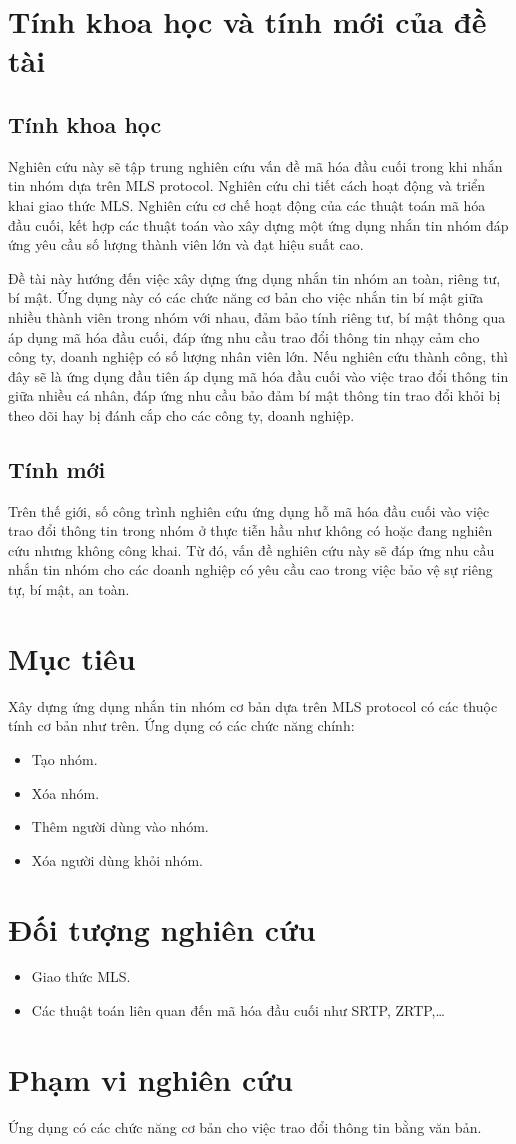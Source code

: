 \documentclass[../main-report.tex]{subfiles}
\begin{document}
\section{Tính khoa học và tính mới của đề tài}
\subsection{Tính khoa học}

Nghiên cứu này sẽ tập trung nghiên cứu vấn đề mã hóa đầu cuối trong khi nhắn tin nhóm dựa trên MLS protocol. Nghiên cứu chi tiết cách hoạt động và triển khai giao thức MLS. Nghiên cứu cơ chế hoạt động của các thuật toán mã hóa đầu cuối, kết hợp các thuật toán vào xây dựng một ứng dụng nhắn tin nhóm đáp ứng yêu cầu số lượng thành viên lớn và đạt hiệu suất cao.

Đề tài này hướng đến việc xây dựng ứng dụng nhắn tin nhóm an toàn, riêng tư, bí mật. Ứng dụng này có các chức năng cơ bản cho việc nhắn tin bí mật giữa nhiều thành viên trong nhóm với nhau, đảm bảo tính riêng tư, bí mật thông qua áp dụng mã hóa đầu cuối, đáp ứng nhu cầu trao đổi thông tin nhạy cảm cho công ty, doanh nghiệp có số lượng nhân viên lớn. Nếu nghiên cứu thành công, thì đây sẽ là ứng dụng đầu tiên áp dụng mã hóa đầu cuối vào việc trao đổi thông tin giữa nhiều cá nhân, đáp ứng nhu cầu bảo đảm bí mật thông tin trao đổi khỏi bị theo dõi hay bị đánh cắp cho các công ty, doanh nghiệp.


\subsection{Tính mới}

Trên thế giới, số công trình nghiên cứu ứng dụng hỗ mã hóa đầu cuối vào việc trao đổi thông tin trong nhóm ở thực tiễn hầu như không có hoặc đang nghiên cứu nhưng không công khai. Từ đó, vấn đề nghiên cứu này sẽ đáp ứng nhu cầu nhắn tin nhóm cho các doanh nghiệp có yêu cầu cao trong việc bảo vệ sự riêng tự, bí mật, an toàn. 

\section{Mục tiêu}

Xây dựng ứng dụng nhắn tin nhóm cơ bản dựa trên MLS protocol có các thuộc tính cơ bản như trên. 
Ứng dụng có các chức năng chính:

\begin{itemize}
\item Tạo nhóm.
\item Xóa nhóm.
\item Thêm người dùng vào nhóm.
\item Xóa người dùng khỏi nhóm.
\end{itemize}

\section{Đối tượng nghiên cứu}
\begin{itemize}
\item Giao thức MLS.
\item Các thuật toán liên quan đến mã hóa đầu cuối như SRTP, ZRTP,…
\end{itemize}

\section{Phạm vi nghiên cứu}
Ứng dụng có các chức năng cơ bản cho việc trao đổi thông tin bằng văn bản.
\end{document}
